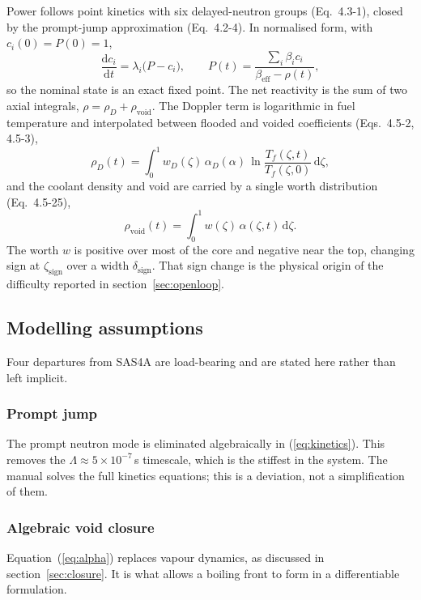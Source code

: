 \documentclass[11pt,a4paper]{article}
\begin{document}
Power follows point kinetics with six delayed-neutron groups (Eq.~4.3-1), closed by the
prompt-jump approximation (Eq.~4.2-4). In normalised form, with $c_i(0) = P(0) = 1$,
\begin{equation}\label{eq:kinetics}
\frac{\mathrm{d}c_i}{\mathrm{d}t} = \lambda_i \bigl(P - c_i\bigr),
\qquad
P(t) = \frac{\sum_i \beta_i c_i}{\beta_{\mathrm{eff}} - \rho(t)} ,
\end{equation}
so the nominal state is an exact fixed point. The net reactivity is the sum of two axial
integrals, $\rho = \rho_D + \rho_{\mathrm{void}}$. The Doppler term is logarithmic in fuel
temperature and interpolated between flooded and voided coefficients (Eqs.~4.5-2, 4.5-3),
\begin{equation}\label{eq:doppler}
\rho_D(t) = \int_0^1 w_D(\zeta)\,\alpha_D(\alpha)\,
            \ln\frac{T_f(\zeta,t)}{T_f(\zeta,0)}\,\mathrm{d}\zeta ,
\end{equation}
and the coolant density and void are carried by a single worth distribution (Eq.~4.5-25),
\begin{equation}\label{eq:voidrho}
\rho_{\mathrm{void}}(t) = \int_0^1 w(\zeta)\,\alpha(\zeta,t)\,\mathrm{d}\zeta .
\end{equation}
The worth $w$ is positive over most of the core and negative near the top, changing sign at
$\zeta_{\mathrm{sign}}$ over a width $\delta_{\mathrm{sign}}$. That sign change is the
physical origin of the difficulty reported in section~\ref{sec:openloop}.

\subsection{Modelling assumptions}

Four departures from SAS4A are load-bearing and are stated here rather than left implicit.

\subsubsection{Prompt jump}
The prompt neutron mode is eliminated algebraically in (\ref{eq:kinetics}). This removes the
$\Lambda \approx 5\times10^{-7}$\,s timescale, which is the stiffest in the system. The
manual solves the full kinetics equations; this is a deviation, not a simplification of
them.

\subsubsection{Algebraic void closure}
Equation~(\ref{eq:alpha}) replaces vapour dynamics, as discussed in
section~\ref{sec:closure}. It is what allows a boiling front to form in a differentiable
formulation.
\end{document}
